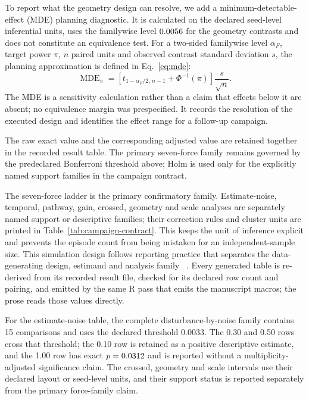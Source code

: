 To report what the geometry design can resolve, we add a minimum-detectable-effect
(MDE) planning diagnostic. It is calculated on the declared seed-level
inferential units, uses the familywise level $0.0056{}$ for the
\GeometryMDEFamily{} geometry contrasts and
does not constitute an equivalence test. For a two-sided familywise level
$\alpha_F$, target power $\pi$, $n$ paired units and observed contrast standard
deviation $s$, the planning approximation is defined in Eq.~\eqref{eq:mde}:
\begin{equation}
  \operatorname{MDE}_{\pi}=
  \left[t_{1-\alpha_F/2,\,n-1}+\Phi^{-1}(\pi)\right]\frac{s}{\sqrt{n}} .
  \label{eq:mde}
\end{equation}
The MDE is a sensitivity calculation rather than a claim that effects below it
are absent; no equivalence margin was prespecified. It records the resolution of
the executed design and identifies the effect range for a follow-up campaign.

The raw exact value and the corresponding adjusted value are retained together in
the recorded result table. The primary seven-force family remains governed by the
predeclared Bonferroni threshold above; Holm is used only for the explicitly named
support families in the campaign contract.

The seven-force ladder is the primary confirmatory family. Estimate-noise,
temporal, pathway, gain, crossed, geometry and scale analyses are separately
named support or descriptive families; their correction rules and cluster units
are printed in Table~\ref{tab:campaign-contract}. This keeps the unit of
inference explicit and prevents the episode count from being mistaken for an
independent-sample size. This simulation design follows reporting practice that
separates the data-generating design, estimand and analysis family
~\cite{morris2019simulation}. Every generated table is re-derived from its
recorded result file, checked for its declared row count and pairing, and emitted by the
same R pass that emits the manuscript macros; the prose reads those values directly.

For the estimate-noise table, the complete disturbance-by-noise family contains
15 comparisons and uses the declared threshold 0.0033. The 0.30 and 0.50 rows
cross that threshold; the 0.10 row is retained as a positive descriptive estimate,
and the 1.00 row has exact $p=0.0312{}$ and is reported without a
multiplicity-adjusted significance claim. The crossed, geometry and scale
intervals use their declared layout or seed-level units, and their support status
is reported separately from the primary force-family claim.

